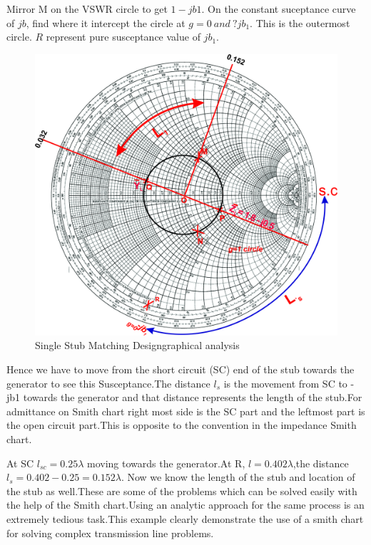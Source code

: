 \begin{exmp}
Mirror M on the VSWR circle to get $1-jb1$. On the constant suceptance curve of $jb$, find where it intercept the circle at $g=0 \ and \ ?jb_1$. This is the outermost circle. $R$ represent pure susceptance value of $jb_1$. 
\begin{figure}[h]
\centering
\includegraphics[width=1\linewidth]{./graphics/fig14}
\caption{Single Stub Matching Design\textemdash\;graphical analysis}
\label{fig:fig14}
\end{figure}

Hence we have to move from the short circuit (SC) end of the stub towards the generator to see this Susceptance.The distance $l_s$ is the movement from SC to -jb1 towards the generator and that distance represents the length of the stub.For admittance on Smith chart right most side is the SC part and the leftmost part is the open circuit part.This is opposite to the convention in the impedance Smith chart.

At SC $l_{sc}=0.25\lambda$ moving towards the generator.At R, $l=0.402\lambda$,the distance $l_s=0.402-0.25=0.152\lambda$. Now we know the length of the stub and location of the stub as well.These are some of the problems which can be solved easily with the help of the Smith chart.Using an analytic approach for the same process is an extremely tedious task.This example clearly demonstrate the use of a smith chart for solving complex transmission line problems.
\end{exmp}

